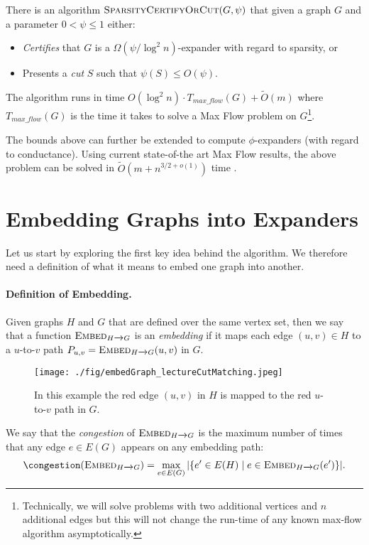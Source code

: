\begin{theorem}
There is an algorithm $\textsc{SparsityCertifyOrCut}(G, \psi)$ that given a graph $G$ and a parameter $0 <\psi \leq 1$ either: 
\begin{itemize}
    \item \emph{Certifies} that $G$ is a $\Omega(\psi/\log^2 n)$-expander with regard to sparsity, or
    \item Presents a \emph{cut} $S$ such that $\psi(S) \leq O(\psi)$.
\end{itemize}
The algorithm runs in time $O(\log^2 n) \cdot T_{max\_flow}(G) + \tilde{O}(m)$ where $T_{max\_flow}(G)$ is the time it takes to solve a Max Flow problem on $G$\footnote{Technically, we will solve problems with two additional vertices and $n$ additional edges but this will not change the run-time of any known max-flow algorithm asymptotically.}.
\end{theorem}

The bounds above can further be extended to compute $\phi$-expanders (with regard to conductance). Using current state-of-the art Max Flow results, the above problem can be solved in $\tilde{O}(m + n^{3/2+o(1)})$ time \cite{BLLSSSW21}. 

\section{Embedding Graphs into Expanders}

Let us start by exploring the first key idea behind the algorithm. We therefore need a definition of what it means to embed one graph into another.

\paragraph{Definition of Embedding.} Given graphs $H$ and $G$ that are defined over the same vertex set, then we say that a function $\textsc{Embed}_{H \xrightarrow{} G}$ is an \emph{embedding} if it maps each edge $(u,v) \in H$ to a $u$-to-$v$ path $P_{u,v} = \textsc{Embed}_{H \xrightarrow{} G}(u,v)$ in $G$. 
\begin{figure}[!ht]
    \centering
    \texttt{[image: ./fig/embedGraph\_lectureCutMatching.jpeg]}
    \caption{In this example the red edge $(u,v)$ in $H$ is mapped to the red $u$-to-$v$ path in $G$.}
    \label{fig:my_label}
\end{figure}

We say that the \emph{congestion} of $\textsc{Embed}_{H \xrightarrow{} G}$ is the maximum number of times that any edge $e \in E(G)$ appears on any embedding path: \[
\congestion(\textsc{Embed}_{H \xrightarrow{} G}) = \max_{e \in E(G)} |\{ e' \in E(H) \;|\; e \in \textsc{Embed}_{H \xrightarrow{} G}(e') \}|.
\]

